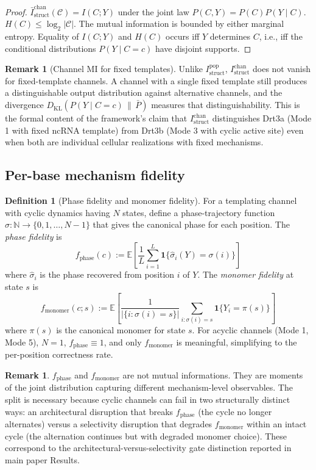 \documentclass[11pt]{article}
\theoremstyle{plain}
\theoremstyle{definition}
\newtheorem{definition}[theorem]{Definition}
\newtheorem{remark}[theorem]{Remark}
\newcommand{\Istructpop}{I_{\mathrm{struct}}^{\mathrm{pop}}}
\newcommand{\Istructchan}{I_{\mathrm{struct}}^{\mathrm{chan}}}
\newcommand{\fphase}{f_{\mathrm{phase}}}
\newcommand{\fmonomer}{f_{\mathrm{monomer}}}
\newcommand{\KL}[2]{D_{\mathrm{KL}}\!\left(#1 \,\|\, #2\right)}
\begin{document}
\begin{proof}
$\bar{I}_{\mathrm{struct}}^{\mathrm{chan}}(\mathcal{C}) = I(C; Y)$ under the joint law $P(C, Y) = P(C) P(Y \mid C)$. $H(C) \le \log_2 |\mathcal{C}|$. The mutual information is bounded by either marginal entropy. Equality of $I(C; Y)$ and $H(C)$ occurs iff $Y$ determines $C$, i.e., iff the conditional distributions $P(Y \mid C = c)$ have disjoint supports.
\end{proof}

\begin{remark}[Channel MI for fixed templates]
Unlike $\Istructpop$, $\Istructchan$ does not vanish for fixed-template channels. A channel with a single fixed template still produces a distinguishable output distribution against alternative channels, and the divergence $\KL{P(Y \mid C = c)}{\bar{P}}$ measures that distinguishability. This is the formal content of the framework's claim that $\Istructchan$ distinguishes Drt3a (Mode 1 with fixed ncRNA template) from Drt3b (Mode 3 with cyclic active site) even when both are individual cellular realizations with fixed mechanisms.
\end{remark}

\subsection{Per-base mechanism fidelity}

\begin{definition}[Phase fidelity and monomer fidelity]
For a templating channel with cyclic dynamics having $N$ states, define a phase-trajectory function $\sigma : \mathbb{N} \to \{0, 1, \ldots, N-1\}$ that gives the canonical phase for each position. The \emph{phase fidelity} is
\[
\fphase(c) := \mathbb{E}\left[\frac{1}{L} \sum_{i=1}^{L} \mathbf{1}\{\hat{\sigma}_i(Y) = \sigma(i)\}\right]
\]
where $\hat{\sigma}_i$ is the phase recovered from position $i$ of $Y$. The \emph{monomer fidelity} at state $s$ is
\[
\fmonomer(c; s) := \mathbb{E}\left[\frac{1}{|\{i : \sigma(i) = s\}|} \sum_{i: \sigma(i) = s} \mathbf{1}\{Y_i = \pi(s)\}\right]
\]
where $\pi(s)$ is the canonical monomer for state $s$. For acyclic channels (Mode 1, Mode 5), $N = 1$, $\fphase \equiv 1$, and only $\fmonomer$ is meaningful, simplifying to the per-position correctness rate.
\end{definition}

\begin{remark}
$\fphase$ and $\fmonomer$ are not mutual informations. They are moments of the joint distribution capturing different mechanism-level observables. The split is necessary because cyclic channels can fail in two structurally distinct ways: an architectural disruption that breaks $\fphase$ (the cycle no longer alternates) versus a selectivity disruption that degrades $\fmonomer$ within an intact cycle (the alternation continues but with degraded monomer choice). These correspond to the architectural-versus-selectivity gate distinction reported in main paper Results.
\end{remark}
\end{document}
